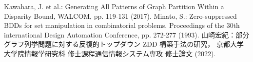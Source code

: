 \documentclass[10pt,a4paper,notitlepage,oneside,twocolumn]{abst_jsarticle}
\begin{document}
\begin{thebibliography}{9}
  Kawahara, J. et al.: Generating All Patterns of Graph Partition Within a Disparity Bound, WALCOM, pp. 119-131 (2017).
  Minato, S.: Zero-suppressed BDDs for set manipulation in combinatorial problems,
  Proceedings of the 30th international Design Automation Conference,
  pp. 272-277 (1993).
  山崎宏紀：部分グラフ列挙問題に対する反復的トップダウン ZDD 構築手法の研究，
  京都大学大学院情報学研究科 修士課程通信情報システム専攻 修士論文 (2022).

\end{thebibliography}
\end{document}
